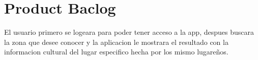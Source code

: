 \chapter{Product Baclog}
El usuario primero se logeara para poder tener acceso a la app, despues buscara la zona que desee conocer y la aplicacion le mostrara el resultado con la informacion cultural del lugar especifico hecha por los mismo lugareños.
